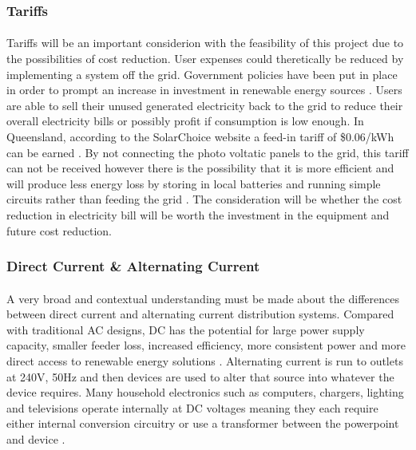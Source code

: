 \subsubsection{Tariffs}

\paragraph{}
Tariffs will be an important considerion with the feasibility of this project due to the possibilities of cost reduction. User expenses could theretically be reduced by implementing a system off the grid. Government policies have been put in place in order to prompt an increase in investment in renewable energy sources \cite{Nelson2011}. Users are able to sell their unused generated electricity back to the grid to reduce their overall electricity bills or possibly profit if consumption is low enough. In Queensland, according to the SolarChoice website a feed-in tariff of \$0.06/kWh can be earned \cite{website:SolarChoice}. By not connecting the photo voltatic panels to the grid, this tariff can not be received however there is the possibility that it is more efficient and will produce less energy loss by storing in local batteries and running simple circuits rather than feeding the grid \cite{AntoniouATzimasARowland2015}. The consideration will be whether the cost reduction in electricity bill will be worth the investment in the equipment and future cost reduction.   

\subsubsection{Direct Current \& Alternating Current}

\paragraph{}
A very broad and contextual understanding must be made about the differences between direct current and alternating current distribution systems. Compared with traditional AC designs, DC has the potential for large power supply capacity, smaller feeder loss, increased efficiency, more consistent power and more direct access to renewable energy solutions \cite{Liu2014}. Alternating current is run to outlets at 240V, 50Hz and then devices are used to alter that source into whatever the device requires. Many household electronics such as computers, chargers, lighting and televisions operate internally at DC voltages meaning they each require either internal conversion circuitry or use a transformer between the powerpoint and device \cite{Paajanen2009}. 

